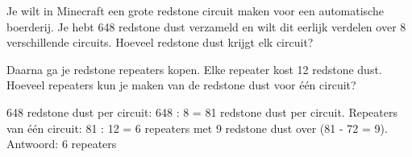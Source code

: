 \begin{opgave}
Je wilt in Minecraft een grote redstone circuit maken voor een automatische boerderij. Je hebt
648 redstone dust verzameld en wilt dit eerlijk verdelen over 8 verschillende circuits.
Hoeveel redstone dust krijgt elk circuit? 

Daarna ga je redstone repeaters kopen. Elke repeater kost 12 redstone dust. Hoeveel repeaters
kun je maken van de redstone dust voor één circuit?
\end{opgave}

\begin{oplossing}
648 redstone dust per circuit: 648 : 8 = 81 redstone dust per circuit.
Repeaters van één circuit: 81 : 12 = 6 repeaters met 9 redstone dust over (81 - 72 = 9).
Antwoord: 6 repeaters
\end{oplossing}